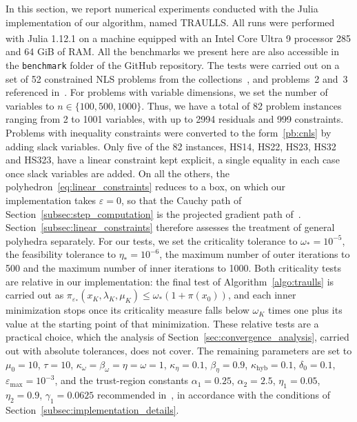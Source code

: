 \documentclass{article}
\numberwithin{equation}{section}
\theoremstyle{plain}
\begin{document}
In this section, we report numerical experiments conducted with the Julia implementation of our algorithm, named TRAULLS. All runs were performed with Julia 1.12.1 on a machine equipped with an Intel\textsuperscript{\textregistered} Core\textsuperscript{\texttrademark} Ultra 9 processor 285 and 64 GiB of RAM. All the benchmarks we present here are also accessible in the \texttt{benchmark} folder of the GitHub repository.
The tests were carried out on a set of 52 constrained NLS problems from the collections~\cite{hockschittkowski:1980, schittkowski:1987, lucksanvlcek:1999}, and problems~2 and~3 referenced in~\cite{biegler-etal2000}. For problems with variable dimensions, we set the number of variables to $n \in \{100, 500, 1000\}$. Thus, we have a total of 82 problem instances ranging from 2 to 1001 variables, with up to 2994 residuals and 999 constraints. Problems with inequality constraints were converted to the form~\eqref{pb:cnls} by adding slack variables. Only five of the 82 instances, HS14, HS22, HS23, HS32 and HS323, have a linear constraint kept explicit, a single equality in each case once slack variables are added. On all the others, the polyhedron~\eqref{eq:linear_constraints} reduces to a box, on which our implementation takes $\varepsilon = 0$, so that the Cauchy path of Section~\ref{subsec:step_computation} is the projected gradient path of~\cite{conn-etal:1988b}. Section~\ref{subsec:linear_constraints} therefore assesses the treatment of general polyhedra separately. For our tests, we set the criticality tolerance to $\omega_* = 10^{-5}$, the feasibility tolerance to $\eta_* = 10^{-6}$, the maximum number of outer iterations to 500 and the maximum number of inner iterations to 1000. Both criticality tests are relative in our implementation: the final test of Algorithm~\ref{algo:traulls} is carried out as $\pi_{\varepsilon_*}(x_K,\lambda_K,\mu_K) \le \omega_*(1+\pi(x_0))$, and each inner minimization stops once its criticality measure falls below $\omega_K$ times one plus its value at the starting point of that minimization. These relative tests are a practical choice, which the analysis of Section~\ref{sec:convergence_analysis}, carried out with absolute tolerances, does not cover. The remaining parameters are set to $\mu_0 = 10$, $\tau = 10$, $\kappa_\omega = \beta_\omega = \eta = \omega = 1$, $\kappa_\eta = 0.1$, $\beta_\eta = 0.9$, $\kappa_{\mathrm{hyb}} = 0.1$, $\delta_0 = 0.1$, $\varepsilon_{\max} = 10^{-3}$, and the trust-region constants $\alpha_1 = 0.25$, $\alpha_2 = 2.5$, $\eta_1 = 0.05$, $\eta_2 = 0.9$, $\gamma_1 = 0.0625$ recommended in~\cite[Section~17.1]{conn-etal:2000}, in accordance with the conditions of Section~\ref{subsec:implementation_details}.
\end{document}
